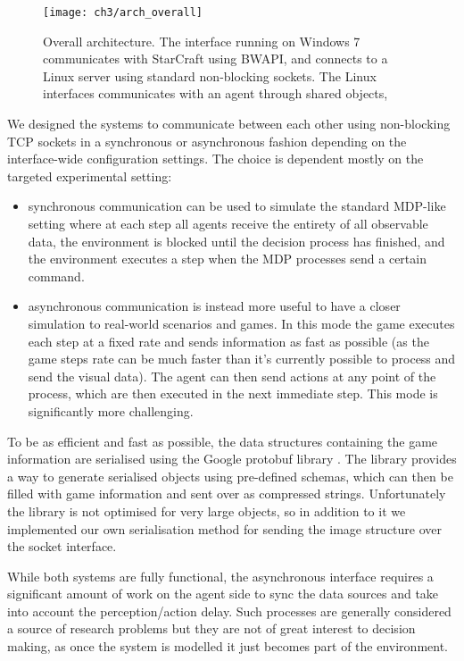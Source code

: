 \begin{figure}[h]
    \centering
    \texttt{[image: ch3/arch\_overall]}
    \caption{Overall architecture. The interface running on Windows 7
      communicates with StarCraft using BWAPI, and connects to a Linux server
      using standard non-blocking sockets. The Linux interfaces communicates
      with an agent through shared objects, }
    \label{fig:arch_ov}
\end{figure}

We designed the systems to communicate between each other using non-blocking TCP
sockets in a synchronous or asynchronous fashion depending on the interface-wide
configuration settings. The choice is dependent mostly on the targeted
experimental setting:

\begin{itemize}
\item synchronous communication can be used to simulate the standard MDP-like
  setting where at each step all agents receive the entirety of all observable
  data, the environment is blocked until the decision process has finished, and
  the environment executes a step when the MDP processes send a certain command.
\item asynchronous communication is instead more useful to have a closer
  simulation to real-world scenarios and games. In this mode the game executes
  each step at a fixed rate and sends information as fast as possible (as the
  game steps rate can be much faster than it's currently possible to process and
  send the visual data). The agent can then send actions at any point of the
  process, which are then executed in the next immediate step.
  This mode is significantly more challenging.
\end{itemize}

To be as efficient and fast as possible, the data structures containing the game
information are serialised using the Google protobuf library
\citep{varda2008protocol}. The library provides a way to generate serialised
objects using pre-defined schemas, which can then be filled with game
information and sent over as compressed strings. Unfortunately the library is
not optimised for very large objects, so in addition to it we implemented our
own serialisation method for sending the image structure over the socket
interface.

While both systems are fully functional, the asynchronous interface requires a
significant amount of work on the agent side to sync the data sources and take
into account the perception/action delay. Such processes are generally
considered a source of research problems but they are not of great interest to
decision making, as once the system is modelled it just becomes part of the
environment.

